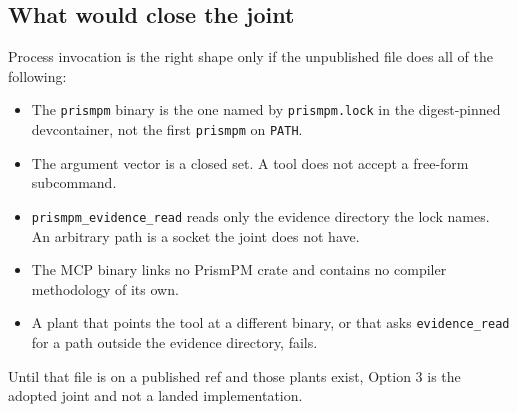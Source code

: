 \documentclass[
]{article}
\providecommand{\tightlist}{%
  \setlength{\itemsep}{0pt}\setlength{\parskip}{0pt}}
\begin{document}
\hypertarget{what-would-close-the-joint}{%
\subsection{What would close the
joint}\label{what-would-close-the-joint}}

Process invocation is the right shape only if the unpublished file does
all of the following:

\begin{itemize}
\tightlist
\item
  The \texttt{prismpm} binary is the one named by \texttt{prismpm.lock}
  in the digest-pinned devcontainer, not the first \texttt{prismpm} on
  \texttt{PATH}.
\item
  The argument vector is a closed set. A tool does not accept a
  free-form subcommand.
\item
  \texttt{prismpm\_evidence\_read} reads only the evidence directory the
  lock names. An arbitrary path is a socket the joint does not have.
\item
  The MCP binary links no PrismPM crate and contains no compiler
  methodology of its own.
\item
  A plant that points the tool at a different binary, or that asks
  \texttt{evidence\_read} for a path outside the evidence directory,
  fails.
\end{itemize}

Until that file is on a published ref and those plants exist, Option 3
is the adopted joint and not a landed implementation.
\end{document}
